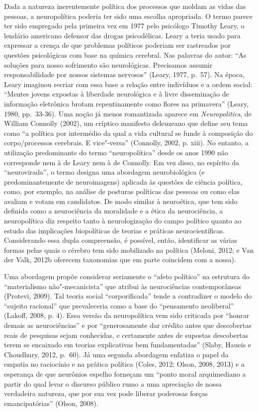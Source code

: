 Dada a natureza inerentemente política dos processos que moldam as vidas
das pessoas, a neuropolítica poderia ter sido uma escolha apropriada. O
termo parece ter sido empregado pela primeira vez em 1977 pelo psicólogo
Timothy Leary, o lendário americano defensor das drogas psicodélicas.
Leary a teria usado para expressar a crença de que problemas políticos
poderiam ser rastreados por questões psicológicas com base na química
cerebral. Nas palavras do autor: ``As soluções para nosso sofrimento são
neurológicas. Precisamos assumir responsabilidade por nossos sistemas
nervosos'' (Leary, 1977, p.~57). Na época, Leary imaginou recriar com
essa base a relação entre indivíduos e a ordem social: ``Mentes jovens
expostas à liberdade neurológica e à livre disseminação de informação
eletrônica brotam repentinamente como flores na primavera'' (Leary, 1980,
pp.~33-36). Uma noção já menos romantizada aparece em
\emph{Neuropolitics}, de William Connolly (2002), um críptico
manifesto deleuzeano que define seu tema como ``a política por
intermédio da qual a vida cultural se funde à composição do
corpo/processos cerebrais. E vice"-versa'' (Connolly, 2002, p. xiii). No
entanto, a utilização predominante do termo ``neuropolítica'' desde os
anos 1990 não corresponde nem à de Leary nem à de Connolly. Em vez
disso, no espírito da ``neurovirada'', o termo designa uma abordagem
neurobiológica (e predominantemente de neuroimagens) aplicada às
questões de ciência política, como, por exemplo, na análise de posturas
políticas das pessoas ou como elas avaliam e votam em candidatos. De modo
similar à neuroética, que tem sido definida como a neurociência da
moralidade e a ética da neurociência, a neuropolítica diz respeito tanto
à neurologização do campo político quanto ao estudo das implicações
biopolíticas de teorias e práticas neurocientíficas. Considerando essa
dupla compreensão, é possível, então, identificar as várias formas pelas
quais o cérebro tem sido mobilizado na política (Meloni, 2012; e Van der
Valk, 2012b oferecem taxonomias que em parte coincidem com a nossa).

Uma abordagem propõe considerar seriamente o ``afeto político'' na
estrutura do ``materialismo não"-mecanicista'' que atribui às
neurociências contemporâneas (Protevi, 2009). Tal teoria social
``corporificada'' tende a contradizer o modelo do ``sujeito racional''
que prevaleceria como a base do ``pensamento neoliberal'' (Lakoff, 2008,
p. 4). Essa versão da neuropolítica vem sido criticada por ``honrar
demais as neurociências'' e por ``generosamente dar crédito antes que
descobertas reais de pesquisas sejam conhecidas, e certamente antes de
supostas descobertas terem se encaixado em teorias explicativas bem
fundamentadas'' (Slaby, Haueis e Choudhury, 2012, p.~60). Já uma segunda
abordagem enfatiza o papel da empatia no raciocínio e na prática
política (Coles, 2012; Olson, 2008, 2013) e a esperança de que neurônios
espelho forneçam um ``ponto moral arquimediano a partir do qual levar o
discurso público rumo a uma apreciação de nossa verdadeira natureza, que
por sua vez pode liberar poderosas forças emancipatórias'' (Olson,
2008).

